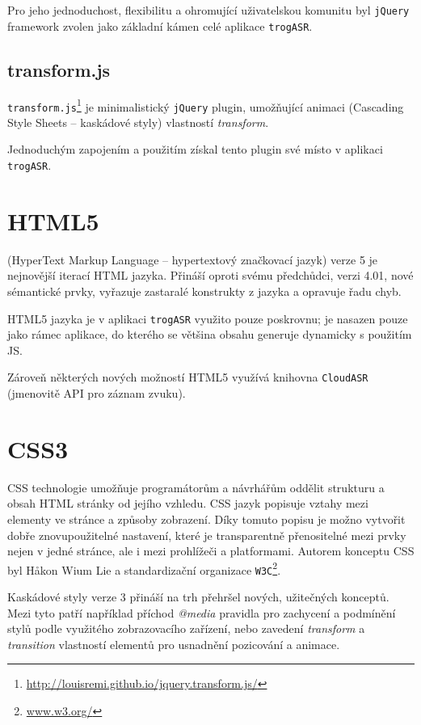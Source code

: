 Pro jeho jednoduchost, flexibilitu a ohromující uživatelskou komunitu byl \verb|jQuery| framework zvolen jako základní kámen celé aplikace \verb|trogASR|.

\subsection{transform.js}

\verb|transform.js|\footnote{\url{http://louisremi.github.io/jquery.transform.js/}} je minimalistický \verb|jQuery| plugin, umožňující animaci  (Cascading Style Sheets -- kaskádové styly) vlastností {\sl transform}.

Jednoduchým zapojením a použitím získal tento plugin své místo v aplikaci \verb|trogASR|.

\section{HTML5}

 (HyperText Markup Language -- hypertextový značkovací jazyk) verze 5 je nejnovější iterací HTML jazyka. Přináší oproti svému předchůdci, verzi 4.01, nové sémantické prvky, vyřazuje zastaralé konstrukty z jazyka a opravuje řadu chyb.

HTML5 jazyka je v aplikaci \verb|trogASR| využito pouze poskrovnu; je nasazen pouze jako rámec aplikace, do kterého se většina obsahu generuje dynamicky s použitím JS.

Zároveň některých nových možností HTML5 využívá knihovna \verb|CloudASR| (jmenovitě API pro záznam zvuku).

\section{CSS3}

CSS technologie umožňuje programátorům a návrhářům oddělit strukturu a obsah HTML stránky od jejího vzhledu. CSS jazyk popisuje vztahy mezi elementy ve stránce a způsoby zobrazení. Díky tomuto popisu je možno vytvořit dobře znovupoužitelné nastavení, které je transparentně přenositelné mezi prvky nejen v jedné stránce, ale i mezi prohlížeči a platformami. Autorem konceptu CSS byl Håkon Wium Lie a standardizační organizace \verb|W3C|\footnote{\url{www.w3.org/}}.

Kaskádové styly verze 3 přináší na trh přehršel nových, užitečných konceptů. Mezi tyto patří například příchod {\sl @media} pravidla pro zachycení a podmínění stylů podle využitého zobrazovacího zařízení, nebo zavedení {\sl transform} a {\sl transition} vlastností elementů pro usnadnění pozicování a animace.

